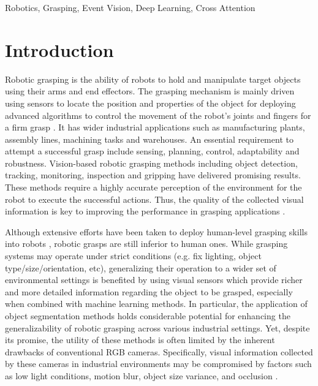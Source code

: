 \documentclass[lettersize,journal]{IEEEtran}
\begin{document}
\begin{IEEEkeywords}
Robotics, Grasping, Event Vision, Deep Learning, Cross Attention
\end{IEEEkeywords}

\section{Introduction}


Robotic grasping is the ability of robots to hold and manipulate target objects using their arms and end effectors. The grasping mechanism is mainly driven using sensors to locate the position and properties of the object for deploying advanced algorithms to control the movement of the robot's joints and fingers for a firm grasp \cite{Dinakaran2023AGrasping}. It has wider industrial applications such as manufacturing plants, assembly lines, machining tasks and warehouses. An essential requirement to attempt a successful grasp include sensing, planning, control, adaptability and robustness. Vision-based robotic grasping methods including object detection, tracking, monitoring, inspection and gripping have delivered promising results. These methods require a highly accurate perception of the environment for the robot to execute the successful actions. Thus, the quality of the collected visual information is key to improving the performance in grasping applications \cite{Du2021Vision-basedReview}. 







Although extensive efforts have been taken to deploy human-level grasping skills into robots \cite{sanket20163Tracker}, robotic grasps are still inferior to human ones. While grasping systems may operate under strict conditions (e.g. fix lighting, object type/size/orientation, etc), generalizing their operation to a wider set of environmental settings is benefited by using visual sensors which provide richer and more detailed information regarding the object to be grasped, especially when combined with machine learning methods. In particular, the application of object segmentation methods holds considerable potential for enhancing the generalizability of robotic grasping across various industrial settings. Yet, despite its promise, the utility of these methods is often limited by the inherent drawbacks of conventional RGB cameras. Specifically, visual information collected by these cameras in industrial environments may be compromised by factors such as low light conditions, motion blur, object size variance, and occlusion \cite{Bader2018ChallengesManufacturing}.
\end{document}
